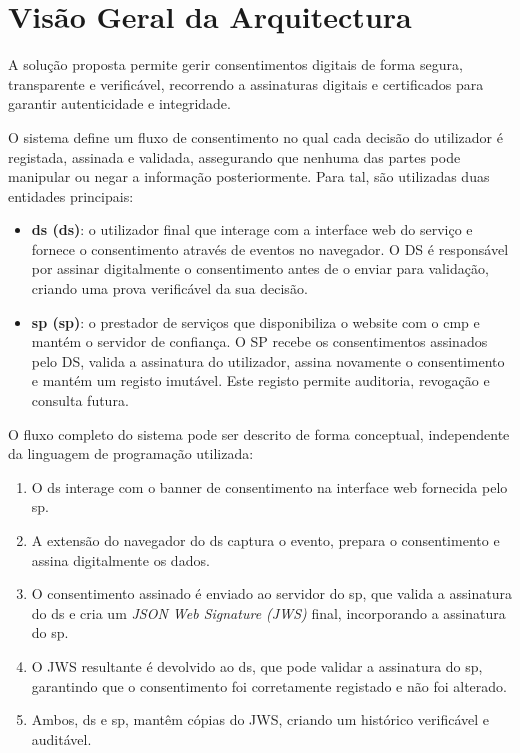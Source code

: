 \chapter{Visão Geral da Arquitectura}

A solução proposta permite gerir consentimentos digitais de forma segura, transparente e verificável, recorrendo a assinaturas digitais e certificados para garantir autenticidade e integridade.

O sistema define um fluxo de consentimento no qual cada decisão do utilizador é registada, assinada e validada, assegurando que nenhuma das partes pode manipular ou negar a informação posteriormente. Para tal, são utilizadas duas entidades principais:

\begin{itemize}
    \item \textbf{\acrlong{ds} (\acrshort{ds})}: o utilizador final que interage com a interface web do serviço e fornece o consentimento através de eventos no navegador. O DS é responsável por assinar digitalmente o consentimento antes de o enviar para validação, criando uma prova verificável da sua decisão.
    \item \textbf{\acrlong{sp} (\acrshort{sp})}: o prestador de serviços que disponibiliza o website com o \acrshort{cmp} e mantém o servidor de confiança. O SP recebe os consentimentos assinados pelo DS, valida a assinatura do utilizador, assina novamente o consentimento e mantém um registo imutável. Este registo permite auditoria, revogação e consulta futura.
\end{itemize}

O fluxo completo do sistema pode ser descrito de forma conceptual, independente da linguagem de programação utilizada:

\begin{enumerate}
    \item O \acrshort{ds} interage com o banner de consentimento na interface web fornecida pelo \acrshort{sp}.
    \item A extensão do navegador do \acrshort{ds} captura o evento, prepara o consentimento e assina digitalmente os dados.
    \item O consentimento assinado é enviado ao servidor do \acrshort{sp}, que valida a assinatura do \acrshort{ds} e cria um \textit{JSON Web Signature (JWS)} final, incorporando a assinatura do \acrshort{sp}.
    \item O JWS resultante é devolvido ao \acrshort{ds}, que pode validar a assinatura do \acrshort{sp}, garantindo que o consentimento foi corretamente registado e não foi alterado.
    \item Ambos, \acrshort{ds} e \acrshort{sp}, mantêm cópias do JWS, criando um histórico verificável e auditável.
\end{enumerate}

